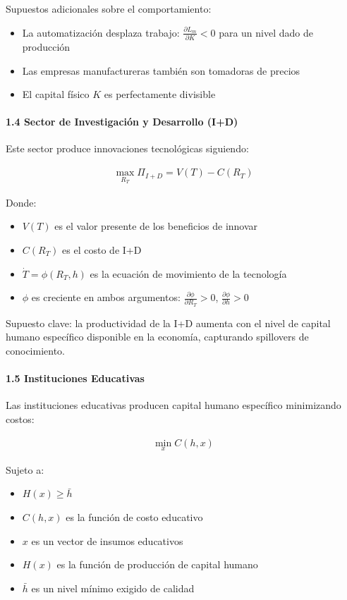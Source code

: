 \documentclass{article}
\theoremstyle{remark}
\theoremstyle{definition}
\begin{document}
\begin{tcolorbox}
Supuestos adicionales sobre el comportamiento:
\begin{itemize}
\item La automatización desplaza trabajo: $\frac{\partial L_m}{\partial K} < 0$ para un nivel dado de producción
\item Las empresas manufactureras también son tomadoras de precios
\item El capital físico $K$ es perfectamente divisible
\end{itemize}

\paragraph{1.4 Sector de Investigación y Desarrollo (I+D)}
Este sector produce innovaciones tecnológicas siguiendo:

\begin{align}
\max_{R_T} \Pi_{I+D} = V(T) - C(R_T)
\end{align}

Donde:
\begin{itemize}
\item $V(T)$ es el valor presente de los beneficios de innovar
\item $C(R_T)$ es el costo de I+D
\item $\dot{T} = \phi(R_T, h)$ es la ecuación de movimiento de la tecnología
\item $\phi$ es creciente en ambos argumentos: $\frac{\partial \phi}{\partial R_T} > 0$, $\frac{\partial \phi}{\partial h} > 0$
\end{itemize}

Supuesto clave: la productividad de la I+D aumenta con el nivel de capital humano específico disponible en la economía, capturando spillovers de conocimiento.

\paragraph{1.5 Instituciones Educativas}
Las instituciones educativas producen capital humano específico minimizando costos:

\begin{align}
\min_{x} C(h, x)
\end{align}

Sujeto a:
\begin{itemize}
\item $H(x) \geq \bar{h}$
\item $C(h,x)$ es la función de costo educativo
\item $x$ es un vector de insumos educativos
\item $H(x)$ es la función de producción de capital humano
\item $\bar{h}$ es un nivel mínimo exigido de calidad
\end{itemize}


\end{tcolorbox}
\end{document}
